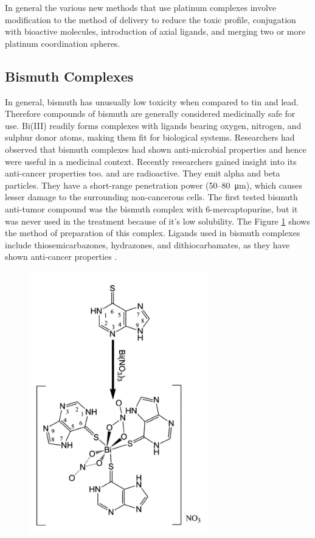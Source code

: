 \hspace{0.1cm}In general the various new methods that use platinum complexes involve modification to the method of delivery to reduce the toxic profile, conjugation with bioactive molecules, introduction of axial ligands, and merging two or more platinum coordination spheres.

\subsection{Bismuth Complexes}
In general, bismuth has unusually low toxicity when compared to tin and lead. Therefore compounds of bismuth are generally considered medicinally safe for use. Bi(III) readily forms complexes with ligands bearing oxygen, nitrogen, and sulphur donor atoms, making them fit for biological systems. Researchers had observed that bismuth complexes had shown anti-microbial properties and hence were useful in a medicinal context.
\hspace{0.1cm}Recently researchers gained insight into its anti-cancer properties too.  and  are radioactive. They emit alpha and beta particles. They have a short-range penetration power (50–\SI{80}{\micro\metre}), which causes lesser damage to the surrounding non-cancerous cells\cite{yang2007biocoordination}. The first tested bismuth anti-tumor compound was the bismuth complex with 6-mercaptopurine, but it was never used in the treatment because of it's low solubility. The Figure \ref{fig:bismuth} shows the method of preparation of this complex. Ligands used in bismuth complexes include thiosemicarbazones, hydrazones, and dithiocarbamates, as they have shown anti-cancer properties \cite{kowalik2019recent}.
\begin{figure}[!ht]
    \centering
    \includegraphics[scale = 0.85]{bismuth.png}
    \caption{}
    \label{fig:bismuth}
\end{figure}
